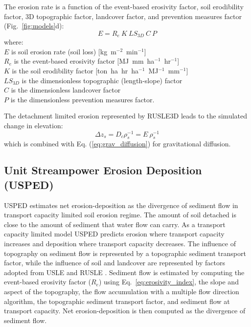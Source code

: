 \documentclass[gmd, manuscript]{copernicus}
\begin{document}
The erosion rate is a function of the event-based erosivity factor, 
soil erodibility factor, 3D topographic factor,
landcover factor, and prevention measures factor 
(Fig.~\ref{fig:models}d):
%
\begin{equation}
\label{eq:rusle}
{E = R_e ~ K ~ LS_{3D} ~ C ~ P}
\end{equation}
%
{\small
\noindent
where: \\
\noindent
\hspace*{0.5em} $E$ is soil erosion rate (soil loss) [\unit{kg~m}$^{-2}$~\unit{min}$^{-1}$]\\
\hspace*{0.5em} $R_e$ is the event-based erosivity factor [\unit{MJ~mm~ha}$^{-1}$~\unit{hr}$^{-1}$]\\
\hspace*{0.5em} $K$ is the soil erodibility factor [\unit{ton~ha~hr~ha}$^{-1}$~\unit{MJ}$^{-1}$~\unit{mm}$^{-1}$]\\
\hspace*{0.5em} $LS_{3D}$ is the dimensionless topographic (length-slope) factor\\
\hspace*{0.5em} $C$ is the dimensionless landcover factor\\
\hspace*{0.5em} $P$ is the dimensionless prevention measures factor.\\
}

\noindent
The detachment limited erosion represented by RUSLE3D leads to the simulated change in elevation: 
\begin{equation}
\label{eq:dz_rusle}
{\Delta z_s = D_c \rho_s^{-1} = E ~ \rho_s^{-1}}
\end{equation}
which is combined with Eq. (\ref{eq:grav_diffusion})
for gravitational diffusion.


\subsection{Unit Streampower Erosion Deposition (USPED)} \label{usped_model}
USPED estimates net erosion-deposition as the divergence of sediment flow
in transport capacity limited soil erosion regime.
The amount of soil detached is 
close to the amount of sediment that water flow can carry.
As a transport capacity limited model
USPED predicts erosion where transport capacity increases
and deposition where transport capacity decreases. 
The influence of topography on sediment flow  
is represented by a topographic sediment transport factor,
while the influence of soil and landcover are represented by 
factors adopted from USLE and RUSLE
\citep{Mitasova1996}.
%
Sediment flow is estimated by computing
the event-based erosivity factor ($R_e$) 
using Eq.~\ref{eq:erosivity_index},
the slope and aspect of the topography,
the flow accumulation with a multiple flow direction algorithm,
the topographic sediment transport factor,
and sediment flow at transport capacity.
Net erosion-deposition is then computed as the divergence of sediment flow. 
\end{document}
